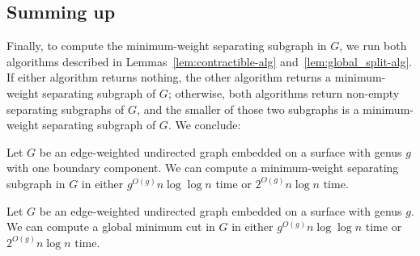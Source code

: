 \documentclass[letterpaper,review]{siamart190516}
\begin{document}
{%

\subsection{Summing up}

Finally, to compute the minimum-weight separating subgraph in $G$, we run both  algorithms described in Lemmas~\ref{lem:contractible-alg} and~\ref{lem:global_split-alg}.  If either algorithm returns nothing, the other algorithm returns a minimum-weight separating subgraph of $G$; otherwise, both algorithms return non-empty separating subgraphs of $G$, and the smaller of those two subgraphs is a minimum-weight separating subgraph of $G$.  We conclude:

\begin{theorem}
Let $G$ be an edge-weighted undirected graph embedded on a surface with genus $g$ with one boundary
component.
We can compute a minimum-weight separating subgraph in $G$ in either $g^{O(g)} n \log \log n$ time or $2^{O(g)} n \log n$ time.
\end{theorem}

\begin{corollary}
Let $G$ be an edge-weighted undirected graph embedded on a surface with genus $g$.
We can compute a global minimum cut in $G$ in either $g^{O(g)} n \log \log n$ time or $2^{O(g)} n \log n$ time.
\end{corollary}


}
\end{document}
